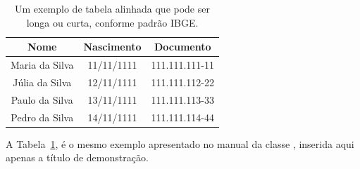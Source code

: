 \documentclass[times,english,brazilian,oneside,section=TITLE]{ifes8}
\begin{document}
\begin{table}[h!]
    \caption[Um exemplo de tabela alinhada conforme padrão IBGE]{Um
      exemplo de tabela alinhada que pode ser longa ou curta, conforme
      padrão IBGE.}%
    \label{tabela-ibge}
    \begin{center}
      \begin{tabular}{ccc}
        \toprule
        Nome           & Nascimento & Documento      \\
        \midrule
        \midrule
        Maria da Silva & 11/11/1111 & 111.111.111-11 \\
        Júlia da Silva & 12/11/1111 & 111.111.112-22 \\
        Paulo da Silva & 13/11/1111 & 111.111.113-33 \\
        Pedro da Silva & 14/11/1111 & 111.111.114-44 \\
        \bottomrule
      \end{tabular}%
    \end{center}
\end{table}

A Tabela~\ref{tabela-ibge}, é o mesmo exemplo apresentado no manual da
classe \abnTeX, inserida aqui apenas a título de demonstração.
\end{document}
